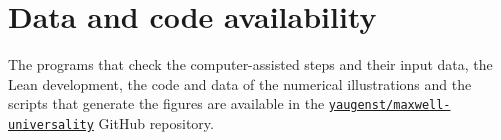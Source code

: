 \section*{Data and code availability}

The programs that check the computer-assisted steps and their input data, the
Lean development, the code and data of the numerical illustrations and the
scripts that generate the figures are available in the
\href{https://github.com/yaugenst/maxwell-universality}{\texttt{yaugenst/maxwell-universality}}
GitHub repository.

